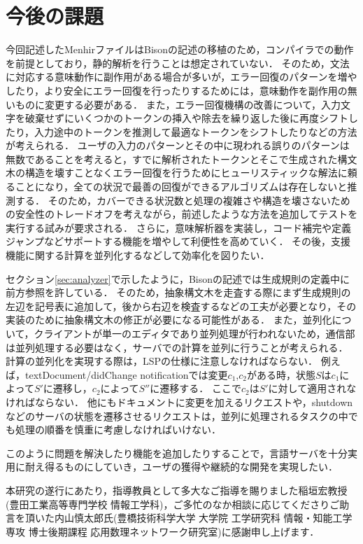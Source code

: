 \documentclass[fontsize=9bp,twocolumn,column_gap=2.36zw,a4paper,report]{jlreq}
\newcommand{\acknowledgement}{%
	{\fontsize{10.5bp}{16bp}\selectfont\bfseries\centering{謝\ \ \ \ \ \ 辞}\par}
}
\begin{document}
\chapter{今後の課題}

今回記述したMenhirファイルはBisonの記述の移植のため，コンパイラでの動作を前提としており，静的解析を行うことは想定されていない．
そのため，文法に対応する意味動作に副作用がある場合が多いが，エラー回復のパターンを増やしたり，より安全にエラー回復を行ったりするためには，意味動作を副作用の無いものに変更する必要がある．
また，エラー回復機構の改善について，入力文字を破棄せずにいくつかのトークンの挿入や除去を繰り返した後に再度シフトしたり，入力途中のトークンを推測して最適なトークンをシフトしたりなどの方法が考えられる．
ユーザの入力のパターンとその中に現われる誤りのパターンは無数であることを考えると，すでに解析されたトークンとそこで生成された構文木の構造を壊すことなくエラー回復を行うためにヒューリスティックな解法に頼ることになり，全ての状況で最善の回復ができるアルゴリズムは存在しないと推測する．
そのため，カバーできる状況数と処理の複雑さや構造を壊さないための安全性のトレードオフを考えながら，前述したような方法を追加してテストを実行する試みが要求される．
さらに，意味解析器を実装し，コード補完や定義ジャンプなどサポートする機能を増やして利便性を高めていく．
その後，支援機能に関する計算を並列化するなどして効率化を図りたい．\par
セクション\ref{sec:analyzer}で示したように，Bisonの記述では生成規則の定義中に前方参照を許している．
そのため，抽象構文木を走査する際にまず生成規則の左辺を記号表に追加して，後から右辺を検査するなどの工夫が必要となり，その実装のために抽象構文木の修正が必要になる可能性がある．
また，並列化について，クライアントが単一のエディタであり並列処理が行われないため，通信部は並列処理する必要はなく，サーバでの計算を並列に行うことが考えられる．
計算の並列化を実現する際は，LSPの仕様に注意しなければならない．
例えば，textDocument/didChange notificationでは変更\(c_1\),\(c_2\)がある時，状態\(S\)は\(c_1\)によって\(S'\)に遷移し，\(c_2\)によって\(S''\)に遷移する．
ここで\(c_2\)は\(S'\)に対して適用されなければならない．
他にもドキュメントに変更を加えるリクエストや，shutdownなどのサーバの状態を遷移させるリクエストは，並列に処理されるタスクの中でも処理の順番を慎重に考慮しなければいけない．\par
このように問題を解決したり機能を追加したりすることで，言語サーバを十分実用に耐え得るものにしていき，ユーザの獲得や継続的な開発を実現したい．
\newline

\acknowledgement
本研究の遂行にあたり，指導教員として多大なご指導を賜りました稲垣宏教授(豊田工業高等専門学校 情報工学科)，ご多忙のなか相談に応じてくださりご助言を頂いた内山慎太郎氏(豊橋技術科学大学 大学院 工学研究科 情報・知能工学専攻 博士後期課程 応用数理ネットワーク研究室)に感謝申し上げます．
\newline
\end{document}

